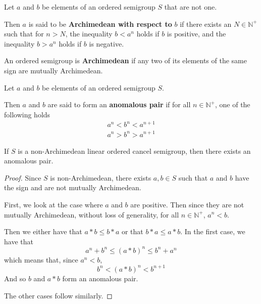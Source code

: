 \begin{definition}\label{def:arch_wrt}\leanok
{}
Let $a$ and $b$ be elements of an ordered semigroup $S$ that are not one.

Then $a$ is said to be \textbf{Archimedean with respect to} $b$
if there exists an $N\in \mathbb{N}^+$ such that for $n > N$,
the inequality $b < a^n$ holds if $b$ is positive,
and the inequality $b > a^n$ holds if $b$ is negative.
\end{definition}

\begin{definition}\label{def:arch}\leanok
{}
An ordered semigroup is \textbf{Archimedean} if any two of its elements
of the same sign are mutually Archimedean.
\end{definition}

\begin{definition}\label{def:anomalous_pair}\leanok
Let $a$ and $b$ be elements of an ordered semigroup $S$.

Then $a$ and $b$ are said to form an \textbf{anomalous pair}
if for all $n\in \mathbb{N}^+$, one of the following holds
\begin{align}
a^n < b^n < a^{n+1} \\
a^n > b^n > a^{n+1}
\end{align}
\end{definition}

\begin{theorem}\label{non_arch_anomalous}\leanok
{}
If $S$ is a non-Archimedean linear ordered cancel semigroup, then there exists an anomalous pair.
\end{theorem}
\begin{proof}
Since $S$ is non-Archimedean, there exists $a,b\in S$ such that
$a$ and $b$ have the sign and are not mutually Archimedean.

First, we look at the case where $a$ and $b$ are positive.
Then since they are not mutually Archimedean, without loss of generality, for all $n\in \mathbb{N}^+$,
$a^n < b$.

Then we either have that $a * b \le b * a$ or that $b*a\le a * b$.
In the first case, we have that
\[
a^n + b^n \le (a*b)^n \le b^n + a^n
\]
which means that, since $a^n < b$,
\[
b^n < (a*b)^n < b^{n+1}
\]
And so $b$ and $a*b$ form an anomalous pair.

The other cases follow similarly.
\end{proof}

